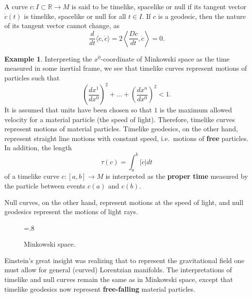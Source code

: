\documentclass[12pt]{amsart}
\newcommand{\bbR}{\mathbb{R}}      %
\theoremstyle{definition}
\newtheorem{Example}[Thm]{Example}
\theoremstyle{remark}
\begin{document}

A curve $c:I \subset \bbR \to M$ is said to be timelike, spacelike or null if its tangent vector $\dot{c}(t)$ is timelike, spacelike or null for all $t \in I$. If $c$ is a geodesic, then the nature of its tangent vector cannot change, as
\[
\frac{d}{dt} \langle \dot{c}, \dot{c} \rangle = 2 \left\langle \frac{D\dot{c}}{dt}, \dot{c} \right\rangle = 0.
\]

\begin{Example}
Interpreting the $x^0$-coordinate of Minkowski space as the time measured in some inertial frame, we see that timelike curves represent motions of particles such that
\[
\left(\frac{dx^1}{dx^0}\right)^2 + \ldots + \left(\frac{dx^n}{dx^0}\right)^2 < 1.
\]
It is assumed that units have been chosen so that $1$ is the maximum allowed velocity for a material particle (the speed of light). Therefore, timelike curves represent motions of material particles. Timelike geodesics, on the other hand, represent straight line motions with constant speed, i.e.~motions of {\bf free} particles. In addition, the length
\[
\tau(c)=\int_a^b \left| \dot{c} \right| dt
\]
of a timelike curve $c:[a,b] \to M$ is interpreted as the {\bf proper time} measured by the particle between events $c(a)$ and $c(b)$.

Null curves, on the other hand, represent motions at the speed of light, and null geodesics represent the motions of light rays.
\end{Example}

\begin{figure}[ht]
\begin{center}
\epsfxsize=.8\textwidth
\leavevmode
{}
\end{center}
\caption{Minkowski space.} 
\end{figure}

Einstein's great insight was realizing that to represent the gravitational field one must allow for general (curved) Lorentzian manifolds. The interpretations of timelike and null curves remain the same as in Minkowski space, except that timelike geodesics now represent {\bf free-falling} material particles.
\end{document}
